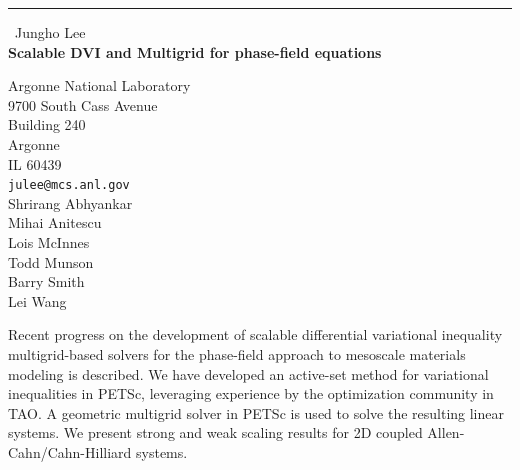 \documentclass{report}
\begin{document}
\begin{center}
\rule{6in}{1pt} \
{\large Jungho Lee \\
{\bf Scalable DVI and Multigrid for phase-field equations }}

Argonne National Laboratory \\ 9700 South Cass Avenue \\ Building 240 \\ Argonne \\ IL 60439
\\
{\tt julee@mcs.anl.gov}\\
Shrirang Abhyankar \\
Mihai Anitescu\\
Lois McInnes\\
Todd Munson\\
Barry Smith\\
Lei Wang \end{center}

Recent progress on the development of scalable differential
variational inequality multigrid-based solvers for the
phase-field approach to mesoscale materials modeling is described. We
have developed an active-set method for variational inequalities
in PETSc, leveraging experience by the optimization community in TAO. A geometric
multigrid solver in PETSc is used to solve the resulting linear
systems. We present strong and weak scaling results for 2D coupled
Allen-Cahn/Cahn-Hilliard systems.
\end{document}
